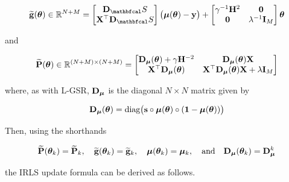 \begin{equation}
    \widetilde{\g}(\thetaa) \in \R^{N + M} = \begin{bmatrix}
        \D_\St \\ \X^\top \D_\St
    \end{bmatrix} \big(\muu(\thetaa) - \y\big) + \begin{bmatrix}
        \gamma^{-1} \HH^2 & \zero \\
    \zero & \lambda^{-1} \I_M
    \end{bmatrix} \thetaa
\end{equation}

and 

\begin{equation}
    \widetilde{\mathbf{P}}(\boldsymbol{\theta})  \in \mathbb{R}^{(N + M) \times (N + M)} = \begin{bmatrix}
        \mathbf{D}_{\boldsymbol{\mu}}(\boldsymbol{\theta}) + \gamma \mathbf{H}^{-2} & \mathbf{D}_{\boldsymbol{\mu}}(\boldsymbol{\theta}) \mathbf{X} \\ 
        \mathbf{X}^\top \mathbf{D}_{\boldsymbol{\mu}}(\boldsymbol{\theta})  & \mathbf{X}^\top \mathbf{D}_{\boldsymbol{\mu}}(\boldsymbol{\theta}) \mathbf{X} + \lambda \mathbf{I}_M
    \end{bmatrix}
\end{equation}

where, as with L-GSR, $\mathbf{D}_{\boldsymbol{\mu}}$ is the diagonal $N \times N$ matrix given by

\begin{equation}
    \mathbf{D}_{\boldsymbol{\mu}}(\boldsymbol{\theta}) = \text{diag}\big(\mathbf{s} \circ \boldsymbol{\mu}(\boldsymbol{\theta}) \circ (\mathbf{1} - \boldsymbol{\mu}(\boldsymbol{\theta}))\big)
\end{equation}

Then, using the shorthands 

\begin{equation*}
    \widetilde{\mathbf{P}}(\boldsymbol{\theta}_k) = \widetilde{\mathbf{P}}_k, \quad \widetilde{\mathbf{g}}(\boldsymbol{\theta}_k) = \widetilde{\mathbf{g}}_k, \quad \boldsymbol{\mu}(\boldsymbol{\theta}_k) = \boldsymbol{\mu}_k, \quad \text{and} \quad \mathbf{D}_{\boldsymbol{\mu}}(\boldsymbol{\theta}_k) = \mathbf{D}_{\boldsymbol{\mu}}^k
\end{equation*}

the IRLS update formula can be derived as follows. 

